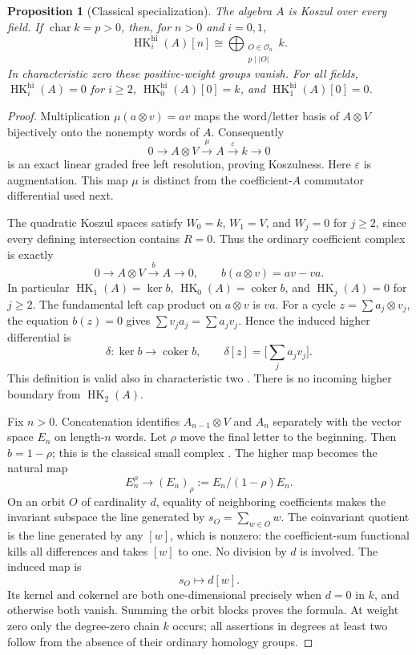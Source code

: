 \documentclass[10pt]{article}
\newtheorem{proposition}{Proposition}
\newcommand{\HK}{\operatorname{HK}}
\begin{document}
\begin{proposition}[Classical specialization]\label{prop:orbits}
The algebra \(A\) is Koszul over every field. If \(\operatorname{char}k=p>0\),
then, for \(n>0\) and \(i=0,1\),
\[
 \HK_i^{\mathrm{hi}}(A)[n]
 \cong\bigoplus_{\substack{O\in\mathcal O_n\\p\mid |O|}}k.
\]
In characteristic zero these positive-weight groups vanish.
For all fields, \(\HK_i^{\mathrm{hi}}(A)=0\) for \(i\ge2\),
\(\HK_0^{\mathrm{hi}}(A)[0]=k\), and
\(\HK_1^{\mathrm{hi}}(A)[0]=0\).
\end{proposition}

\begin{proof}
Multiplication \(\mu(a\otimes v)=av\) maps the word/letter basis
of \(A\otimes V\) bijectively onto the nonempty words of \(A\).
Consequently
\[
 0\longrightarrow A\otimes V\xrightarrow{\ \mu\ }A
 \xrightarrow{\ \varepsilon\ }k\longrightarrow0
\]
is an exact linear graded free left resolution, proving Koszulness.
Here \(\varepsilon\) is augmentation. This map \(\mu\) is distinct
from the coefficient-\(A\) commutator differential used next.

The quadratic Koszul spaces satisfy \(W_0=k\), \(W_1=V\), and
\(W_j=0\) for \(j\ge2\), since every defining intersection contains
\(R=0\). Thus the ordinary coefficient complex is exactly
\[
 0\longrightarrow A\otimes V\xrightarrow{\ b\ }A\longrightarrow0,
 \qquad b(a\otimes v)=av-va.
\]
In particular \(\HK_1(A)=\ker b\), \(\HK_0(A)=\operatorname{coker}b\),
and \(\HK_j(A)=0\) for \(j\ge2\).
The fundamental left cap product on \(a\otimes v\) is \(va\).
For a cycle \(z=\sum a_j\otimes v_j\), the equation \(b(z)=0\)
gives \(\sum v_ja_j=\sum a_jv_j\). Hence the induced higher
differential is
\[
 \delta:\ker b\longrightarrow\operatorname{coker}b,
 \qquad \delta[z]=\Big[\sum_j a_jv_j\Big].
\]
This definition is valid also in characteristic two
\cite[\S5.2]{BLS}. There is no incoming higher boundary from \(\HK_2(A)\).

Fix \(n>0\). Concatenation identifies \(A_{n-1}\otimes V\)
and \(A_n\) separately with the vector space \(E_n\) on length-\(n\)
words. Let \(\rho\) move the final letter to the beginning.
Then \(b=1-\rho\); this is the classical small complex
\cite[Lemmas~5.1--5.2]{LQ}. The higher map becomes the natural map
\[
 E_n^\rho\longrightarrow (E_n)_\rho
       :=E_n/(1-\rho)E_n.
\]
On an orbit \(O\) of cardinality \(d\), equality of neighboring
coefficients makes the invariant subspace the line generated by
\(s_O=\sum_{w\in O}w\). The coinvariant quotient is the line
generated by any \([w]\), which is nonzero: the coefficient-sum
functional kills all differences and takes \([w]\) to one.
No division by \(d\) is involved. The induced map is
\[
 s_O\longmapsto d[w].
\]
Its kernel and cokernel are both one-dimensional precisely when
\(d=0\) in \(k\), and otherwise both vanish. Summing the orbit
blocks proves the formula. At weight zero only the degree-zero
chain \(k\) occurs; all assertions in degrees at least two follow
from the absence of their ordinary homology groups.
\end{proof}
\end{document}

